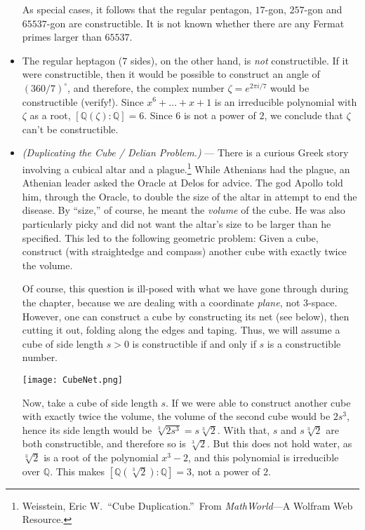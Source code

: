 \documentclass[leqno]{book}
\begin{document}
\begin{itemize}
As special cases, it follows that the regular pentagon, $17$-gon, $257$-gon and $65537$-gon are constructible.  It is not known whether there are any Fermat primes larger than $65537$.

\item The regular heptagon ($7$ sides), on the other hand, is \emph{not} constructible.  If it were constructible, then it would be possible to construct an angle of $(360/7)^\circ$, and therefore, the complex number $\zeta=e^{2\pi i/7}$ would be constructible (verify!).  Since $x^6+\dots+x+1$ is an irreducible polynomial with $\zeta$ as a root, $[\mathbb Q(\zeta):\mathbb Q]=6$.  Since $6$ is not a power of $2$, we conclude that $\zeta$ can't be constructible.

\item\emph{(Duplicating the Cube / Delian Problem.)} \---- There is a curious Greek story involving a cubical altar and a plague.\footnote{Weisstein, Eric W.~``Cube Duplication.''~From \emph{MathWorld}\----A Wolfram Web Resource.}  While Athenians had the plague, an Athenian leader asked the Oracle at Delos for advice.  The god Apollo told him, through the Oracle, to double the size of the altar in attempt to end the disease.  By ``size,'' of course, he meant the \emph{volume} of the cube.  He was also particularly picky and did not want the altar's size to be larger than he specified.  This led to the following geometric problem: Given a cube, construct (with straightedge and compass) another cube with exactly twice the volume.

Of course, this question is ill-posed with what we have gone through during the chapter, because we are dealing with a coordinate \emph{plane}, not $3$-space.  However, one can construct a cube by constructing its net (see below), then cutting it out, folding along the edges and taping.  Thus, we will assume a cube of side length $s>0$ is constructible if and only if $s$ is a constructible number.
\begin{center}\texttt{[image: CubeNet.png]}\end{center}
Now, take a cube of side length $s$.  If we were able to construct another cube with exactly twice the volume, the volume of the second cube would be $2s^3$, hence its side length would be $\sqrt[3]{2s^3}=s\sqrt[3]2$.  With that, $s$ and $s\sqrt[3]2$ are both constructible, and therefore so is $\sqrt[3]2$.  But this does not hold water, as $\sqrt[3]2$ is a root of the polynomial $x^3-2$, and this polynomial is irreducible over $\mathbb Q$.  This makes $[\mathbb Q(\sqrt[3]2):\mathbb Q]=3$, not a power of $2$.


\end{itemize}
\end{document}
